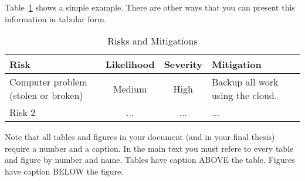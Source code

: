 \documentclass{article}
\begin{document}
Table~\ref{tab:my_label} shows a simple example. There are other ways that you can present this information in tabular form.

\begin{table}[h]
    \centering
    \caption{Risks and Mitigations}
    \label{tab:my_label}
    \begin{tabular}{|p{3cm}|c|c|p{3cm}|}
        \hline
         Risk & Likelihood & Severity & Mitigation \\ \hline
         Computer problem (stolen or broken) & Medium & High & Backup all work using the cloud.\\ \hline
         Risk 2 & ... & ... & ...\\ \hline
    \end{tabular}
\end{table}

Note that all tables and figures in your document (and in your final thesis) require a number and a caption. In the main text you must refere to every table and figure by number and name. Tables have caption ABOVE the table. Figures have caption BELOW the figure. 
\end{document}

